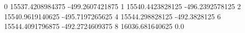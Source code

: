 0 15537.4208984375 -499.2607421875
1 15540.4423828125 -496.2392578125
2 15540.9619140625 -495.7197265625
4 15544.298828125 -492.3828125
6 15544.4091796875 -492.2724609375
8 16036.681640625 0.0
